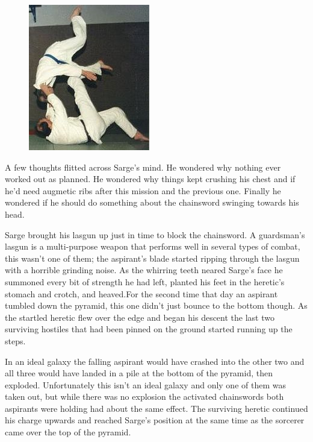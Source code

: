 \begin{figure}
	\begin{center}
		\includegraphics[width=\figwidth]{pics/6/44.png}
	\end{center}
\end{figure}
A few thoughts flitted across Sarge's mind. 
He wondered why nothing ever worked out as planned. 
He wondered why things kept crushing his chest and if he'd need augmetic ribs after this mission and the previous one. 
Finally he wondered if he should do something about the chainsword swinging towards his head.

Sarge brought his lasgun up just in time to block the chainsword. 
A guardsman's lasgun is a multi-purpose weapon that performs well in several types of combat, this wasn't one of them; the aspirant's blade started ripping through the lasgun with a horrible grinding noise. 
As the whirring teeth neared Sarge's face he summoned every bit of strength he had left, planted his feet in the heretic's stomach and crotch, and heaved.For the second time that day an aspirant tumbled down the pyramid, this one didn't just bounce to the bottom though. 
As the startled heretic flew over the edge and began his descent the last two surviving hostiles that had been pinned on the ground started running up the steps. 

In an ideal galaxy the falling aspirant would have crashed into the other two and all three would have landed in a pile at the bottom of the pyramid, then exploded. 
Unfortunately this isn't an ideal galaxy and only one of them was taken out, but while there was no explosion the activated chainswords both aspirants were holding had about the same effect. 
The surviving heretic continued his charge upwards and reached Sarge's position at the same time as the sorcerer came over the top of the pyramid.

